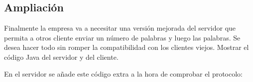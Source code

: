 \documentclass[letterpaper,10pt,spanish]{sphinxmanual}
\begin{document}
\begin{sphinxVerbatim}[commandchars=\\\{\}]
           \PYG{o}{[}\PYG{o}{]}  
                  
                 
                         
                    
                 
         
 
\end{sphinxVerbatim}


\subsection{Ampliación}
\label{\detokenize{textos/tema3:ampliacion}}
Finalmente la empresa va a necesitar una versión mejorada del servidor que permita a otros cliente enviar un número de palabras y luego las palabras. Se desea hacer todo sin romper la compatibilidad con los clientes viejos. Mostrar el código Java del servidor y del cliente.

En el servidor se añade este código extra a la hora de comprobar el protocolo:
\end{document}
